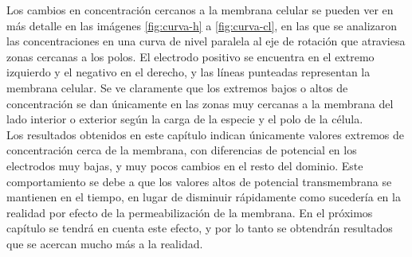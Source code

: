 Los cambios en concentración cercanos a la membrana celular se pueden ver en más detalle en las imágenes \ref{fig:curva-h} a \ref{fig:curva-cl}, en las que se analizaron las concentraciones en una curva de nivel paralela al eje de rotación que atraviesa zonas cercanas a los polos. El electrodo positivo se encuentra en el extremo izquierdo y el negativo en el derecho, y las líneas punteadas representan la membrana celular. Se ve claramente que los extremos bajos o altos de concentración se dan únicamente en las zonas muy cercanas a la membrana del lado interior o exterior según la carga de la especie y el polo de la célula. \\

Los resultados obtenidos en este capítulo indican únicamente valores extremos de concentración cerca de la membrana, con diferencias de potencial en los electrodos muy bajas, y muy pocos cambios en el resto del dominio. Este comportamiento se debe a que los valores altos de potencial transmembrana se mantienen en el tiempo, en lugar de disminuir rápidamente como sucedería en la realidad por efecto de la permeabilización de la membrana. En el próximos capítulo se tendrá en cuenta este efecto, y por lo tanto se obtendrán resultados que se acercan mucho más a la realidad.


